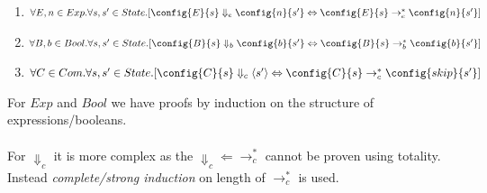 \begin{enumerate}
	\item $\forall E, n \in Exp. \forall s, s' \in State . [\config{E}{s} \Downarrow_e \config{n}{s'} \Leftrightarrow \config{E}{s} \to_e^* \config{n}{s'}]$
	\item $\forall B, b \in Bool. \forall s, s' \in State . [\config{B}{s} \Downarrow_b \config{b}{s'} \Leftrightarrow \config{B}{s} \to_b^* \config{b}{s'}]$
	\item $\forall C \in Com. \forall s, s' \in State . [\config{C}{s} \Downarrow_c \langle s' \rangle \Leftrightarrow \config{C}{s} \to_c^* \config{skip}{s'}]$
\end{enumerate}
For $Exp$ and $Bool$ we have proofs by induction on the structure of expressions/booleans.
\\
\\ For $\Downarrow_c$ it is more complex as the $\Downarrow_c \Leftarrow \to_c^*$ cannot be proven using totality. Instead \textit{complete/strong induction} on length of $\to_c^*$ is used.

